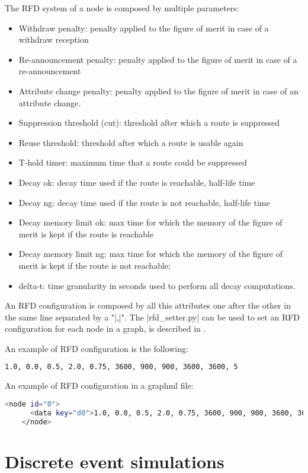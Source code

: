 \documentclass[10pt,journal,onecolumn]{IEEEtran}
\begin{document}
The \ac{RFD} system of a node is composed by multiple parameters:
\begin{itemize}
		\item Withdraw penalty: penalty applied to the figure of merit in case 
			of a withdraw reception
		\item Re-announcement penalty: penalty applied to the figure of merit
			in case of a re-announcement
		\item Attribute change penalty: penalty applied to the figure of merit
			in case of an attribute change.
		\item Suppression threshold (cut): threshold after which a route is 
			suppressed
		\item Reuse threshold: threshold after which a route is usable again
		\item T-hold timer: maximum time that a route could be suppressed
		\item Decay ok: decay time used if the route is reachable, half-life time
		\item Decay ng: decay time used if the route is not reachable, half-life time
		\item Decay memory limit ok: max time for which the memory of the figure
			of merit is kept if the route is reachable
		\item Decay memory limit ng: max time for which the memory of the figure
			of merit is kept if the route is not reachable;
		\item delta-t: time granularity in seconds used to perform all decay computations.
\end{itemize}	

An \ac{RFD} configuration is composed by all this attributes one after the other
in the same line separated by a "|,|".
The |rfd_setter.py| can be used to set an \ac{RFD} configuration for each node in 
a graph, is described in .

An example of \ac{RFD} configuration is the following:
\begin{lstlisting}[language=bash]
	1.0, 0.0, 0.5, 2.0, 0.75, 3600, 900, 900, 3600, 3600, 5
\end{lstlisting}

An example of \ac{RFD} configuration in a graphml file:
\begin{lstlisting}[language=bash]
	<node id="0">
	  <data key="d0">1.0, 0.0, 0.5, 2.0, 0.75, 3600, 900, 900, 3600, 3600, 5</data>
	</node> 
\end{lstlisting}

\section{Discrete event simulations}
\label{sec:des}
\end{document}
